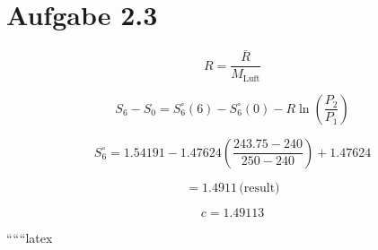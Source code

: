 \section*{Aufgabe 2.3}

\[
R = \frac{\bar{R}}{M_{\text{Luft}}}
\]

\[
S_6 - S_0 = S_6^\circ (6) - S_6^\circ (0) - R \ln \left( \frac{P_2}{P_1} \right)
\]


\[
S_6^\circ = 1.54191 - 1.47624 \left( \frac{243.75 - 240}{250 - 240} \right) + 1.47624
\]

\[
= 1.4911 \, \text{(result)}
\]

\[
c = 1.49113
\]

``````latex


